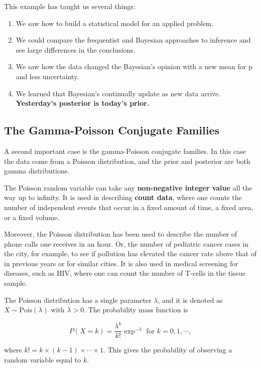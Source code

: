 \documentclass[]{book}
\theoremstyle{definition}
\theoremstyle{definition}
\theoremstyle{definition}
\theoremstyle{remark}
\begin{document}
This example has taught us several things:

\begin{enumerate}
\def\labelenumi{\arabic{enumi}.}
\item
  We saw how to build a statistical model for an applied problem.
\item
  We could compare the frequentist and Bayesian approaches to inference
  and see large differences in the conclusions.
\item
  We saw how the data changed the Bayesian's opinion with a new mean for
  p and less uncertainty.
\item
  We learned that Bayesian's continually update as new data arrive.
  \textbf{Yesterday's posterior is today's prior.}
\end{enumerate}

\subsection{The Gamma-Poisson Conjugate
Families}\label{the-gamma-poisson-conjugate-families}

A second important case is the gamma-Poisson conjugate families. In this
case the data come from a Poisson distribution, and the prior and
posterior are both gamma distributions.

The Poisson random variable can take any \textbf{non-negative integer
value} all the way up to infinity. It is used in describing
\textbf{count data}, where one counts the number of independent events
that occur in a fixed amount of time, a fixed area, or a fixed volume.

Moreover, the Poisson distribution has been used to describe the number
of phone calls one receives in an hour. Or, the number of pediatric
cancer cases in the city, for example, to see if pollution has elevated
the cancer rate above that of in previous years or for similar cities.
It is also used in medical screening for diseases, such as HIV, where
one can count the number of T-cells in the tissue sample.

The Poisson distribution has a single parameter \(\lambda\), and it is
denoted as \(X \sim \text{Pois}(\lambda)\) with \(\lambda>0\). The
probability mass function is

\[P(X=k) = \frac{\lambda^k}{k!} \exp^{-\lambda} \text{ for } k=0,1,\cdots,\]

where \(k! = k \times (k-1) \times \cdots \times 1\). This gives the
probability of observing a random variable equal to \(k\).
\end{document}
